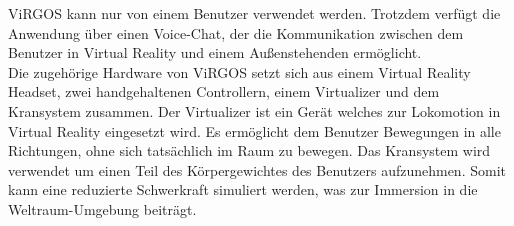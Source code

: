ViRGOS kann nur von einem Benutzer verwendet werden. Trotzdem verfügt die Anwendung über einen Voice-Chat, der die Kommunikation zwischen dem Benutzer in Virtual Reality und einem Außenstehenden ermöglicht. \\

Die zugehörige Hardware von ViRGOS setzt sich aus einem Virtual Reality Headset, zwei handgehaltenen Controllern, einem Virtualizer und dem Kransystem zusammen. Der Virtualizer ist ein Gerät welches zur Lokomotion in Virtual Reality eingesetzt wird. Es ermöglicht dem Benutzer Bewegungen in alle Richtungen, ohne sich tatsächlich im Raum zu bewegen. Das Kransystem wird verwendet um einen Teil des Körpergewichtes des Benutzers aufzunehmen. Somit kann eine reduzierte Schwerkraft simuliert werden, was zur Immersion in die Weltraum-Umgebung beiträgt. 
 
